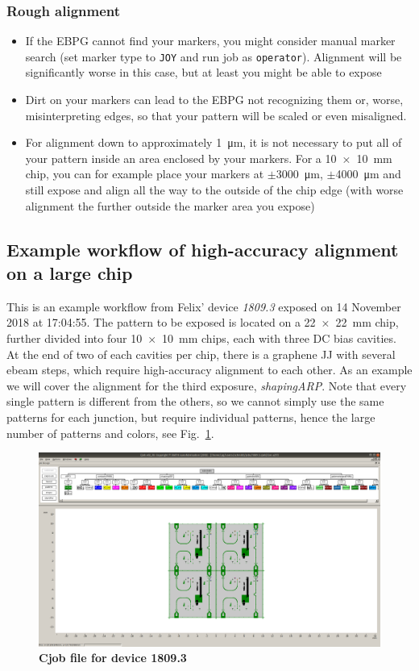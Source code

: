 \subsubsection{Rough alignment}
\begin{itemize}
	\item If the EBPG cannot find your markers, you might consider manual marker search (set marker type to \lstinline|JOY| and run job as \lstinline|operator|). 
	Alignment will be significantly worse in this case, but at least you might be able to expose
	\item Dirt on your markers can lead to the EBPG not recognizing them or, worse, misinterpreting edges, so that your pattern will be scaled or even misaligned.
	\item For alignment down to approximately \SI{1}{\micro\meter}, it is not necessary to put all of your pattern inside an area enclosed by your markers. 
	For a \SI{10x10}{\milli\meter} chip, you can for example place your markers at $\pm$\SI{3000}{\micro\meter}, $\pm$\SI{4000}{\micro\meter} and still expose and align all the way to the outside of the chip edge (with worse alignment the further outside the marker area you expose)
\end{itemize}

\subsection{Example workflow of high-accuracy alignment on a large chip}
%
This is an example workflow from Felix' device \textit{1809.3} exposed on 14 November 2018 at 17:04:55.
%
The pattern to be exposed is located on a \SI{22x22}{\milli\meter} chip, further divided into four \SI{10x10}{\milli\meter} chips, each with three DC bias cavities. 
%
At the end of two of each cavities per chip, there is a graphene JJ with several ebeam steps, which require high-accuracy alignment to each other. 
%
As an example we will cover the alignment for the third exposure, \textit{shapingARP}. 
%
Note that every single pattern is different from the others, so we cannot simply use the same patterns for each junction, but require individual patterns, hence the large number of patterns and colors, see Fig.~\ref{fig:ebeam1}.

\begin{figure}
	\centering
	\includegraphics[width=\linewidth]{appendix/figs/ebeam1}
	\caption{
	\textbf{Cjob file for device 1809.3}
	}
	\label{fig:ebeam1}
\end{figure}


